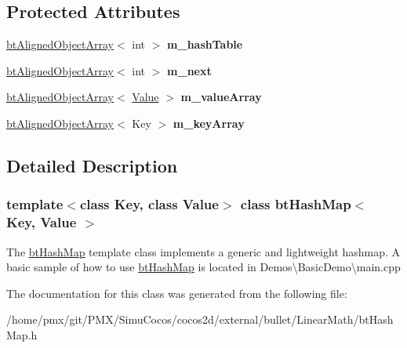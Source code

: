 \subsection*{Protected Attributes}
\begin{DoxyCompactItemize}
\item 
\mbox{\label{classbtHashMap_ae0bb86659a6b28be089065671b727f3c}} 
\hyperlink{classbtAlignedObjectArray}{bt\+Aligned\+Object\+Array}$<$ int $>$ {\bfseries m\+\_\+hash\+Table}
\item 
\mbox{\label{classbtHashMap_ac9425460bb59d8bec5b0c7324ed1e9c6}} 
\hyperlink{classbtAlignedObjectArray}{bt\+Aligned\+Object\+Array}$<$ int $>$ {\bfseries m\+\_\+next}
\item 
\mbox{\label{classbtHashMap_ace2f5fb1dc556aebd15c67f13688ff57}} 
\hyperlink{classbtAlignedObjectArray}{bt\+Aligned\+Object\+Array}$<$ \hyperlink{classValue}{Value} $>$ {\bfseries m\+\_\+value\+Array}
\item 
\mbox{\label{classbtHashMap_a90963f01d747c346df8d515d15e1a312}} 
\hyperlink{classbtAlignedObjectArray}{bt\+Aligned\+Object\+Array}$<$ Key $>$ {\bfseries m\+\_\+key\+Array}
\end{DoxyCompactItemize}


\subsection{Detailed Description}
\subsubsection*{template$<$class Key, class Value$>$\newline
class bt\+Hash\+Map$<$ Key, Value $>$}

The \hyperlink{classbtHashMap}{bt\+Hash\+Map} template class implements a generic and lightweight hashmap. A basic sample of how to use \hyperlink{classbtHashMap}{bt\+Hash\+Map} is located in Demos\textbackslash{}\+Basic\+Demo\textbackslash{}main.\+cpp 

The documentation for this class was generated from the following file\+:\begin{DoxyCompactItemize}
\item 
/home/pmx/git/\+P\+M\+X/\+Simu\+Cocos/cocos2d/external/bullet/\+Linear\+Math/bt\+Hash\+Map.\+h\end{DoxyCompactItemize}
